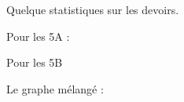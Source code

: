 
Quelque statistiques sur les devoirs.

\vfill

Pour les 5A :


\begin{center}
   
\end{center}

\vfill

Pour les 5B

\begin{center}
   
\end{center}

Le graphe mélangé :

